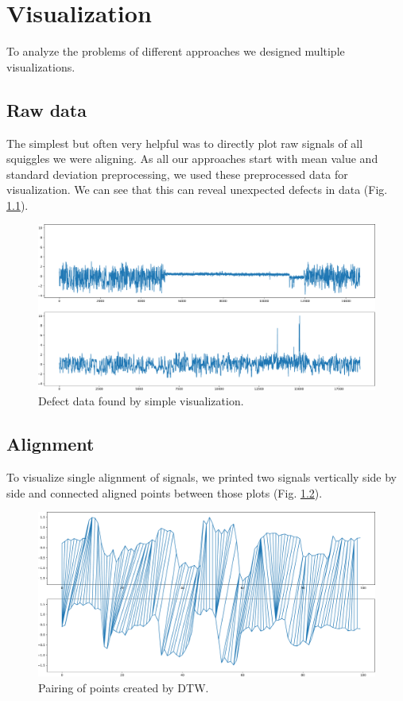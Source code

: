 \chapter{Visualization}

\label{kap:visualization} %

To analyze the problems of different approaches we designed multiple visualizations.

\section{Raw data}

The simplest but often very helpful was to directly plot raw signals of all squiggles we were aligning. As all our approaches start with mean value and standard deviation preprocessing, 
we used these preprocessed data for visualization. We can see that this can reveal unexpected defects in data (Fig. \ref{fig:signals}). 

\begin{figure}[h]
  \centering
  \includegraphics[width=1.0\textwidth]{images/signals}
  \caption{Defect data found by simple visualization.}
  \label{fig:signals}
\end{figure}

\section{Alignment}
To visualize single alignment of signals, we printed two signals vertically side by side and connected
aligned points between those plots (Fig. \ref{fig:pairing2}). 

\begin{figure}
  \centering
  \includegraphics[width=1.0\textwidth]{images/ciary}
  \caption{Pairing of points created by DTW.}
  \label{fig:pairing2}
\end{figure}

